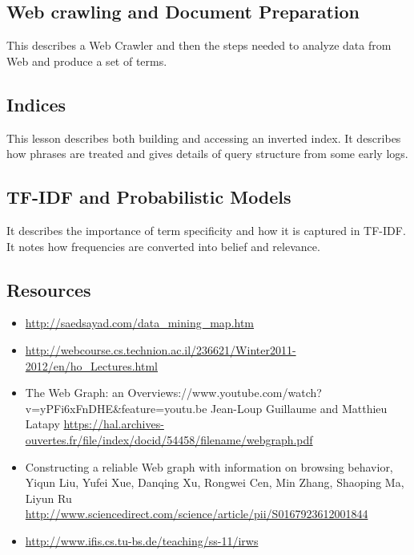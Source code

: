 \subsection{Web crawling and Document
Preparation}\label{web-crawling-and-document-preparation}


This describes a Web Crawler and then the steps needed to analyze data
from Web and produce a set of terms.



\subsection{Indices}\label{indices}


This lesson describes both building and accessing an inverted index. It
describes how phrases are treated and gives details of query structure
from some early logs.



\subsection{TF-IDF and Probabilistic
Models}\label{tf-idf-and-probabilistic-models}


It describes the importance of term specificity and how it is captured
in TF-IDF. It notes how frequencies are converted into belief and
relevance.


\subsection{Resources}\label{resources}

\begin{itemize}

\item
  \url{http://saedsayad.com/data_mining_map.htm}
\item
  \url{http://webcourse.cs.technion.ac.il/236621/Winter2011-2012/en/ho_Lectures.html}
\item
  The Web Graph: an
  Overviews://www.youtube.com/watch?v=yPFi6xFnDHE\&feature=youtu.be
  Jean-Loup Guillaume and Matthieu Latapy
  \url{https://hal.archives-ouvertes.fr/file/index/docid/54458/filename/webgraph.pdf}
\item
  Constructing a reliable Web graph with information on browsing
  behavior, Yiqun Liu, Yufei Xue, Danqing Xu, Rongwei Cen, Min Zhang,
  Shaoping Ma, Liyun Ru
  \url{http://www.sciencedirect.com/science/article/pii/S0167923612001844}
\item
  \url{http://www.ifis.cs.tu-bs.de/teaching/ss-11/irws}
\end{itemize}


